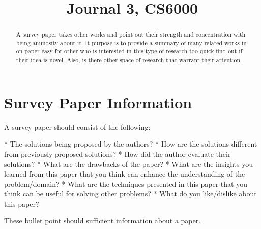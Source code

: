\documentclass[conference]{IEEEtran}
\begin{document}
\title{Journal 3, CS6000}


\author{

}

\maketitle

\begin{abstract}
A survey paper takes other works and point out their strength and concentration with being animosity about it. It purpose is to provide a summary of many related works in on paper easy for other who is interested in this type of research too quick find out if their idea is novel. Also, is there other space of research that warrant their attention.

\end{abstract}


\section{Survey Paper Information}

A survey paper should consist of the following:

* The solutions being proposed by the authors?
* How are the solutions different from previously proposed solutions?
* How did the author evaluate their solutions?
* What are the drawbacks of the paper?
* What are the insights you learned from this paper that you think can enhance the understanding of the problem/domain?
* What are the techniques presented in this paper that you think can be useful for solving other problems?
* What do you like/dislike about this paper?

These bullet point should sufficient information about a paper.
\end{document}
